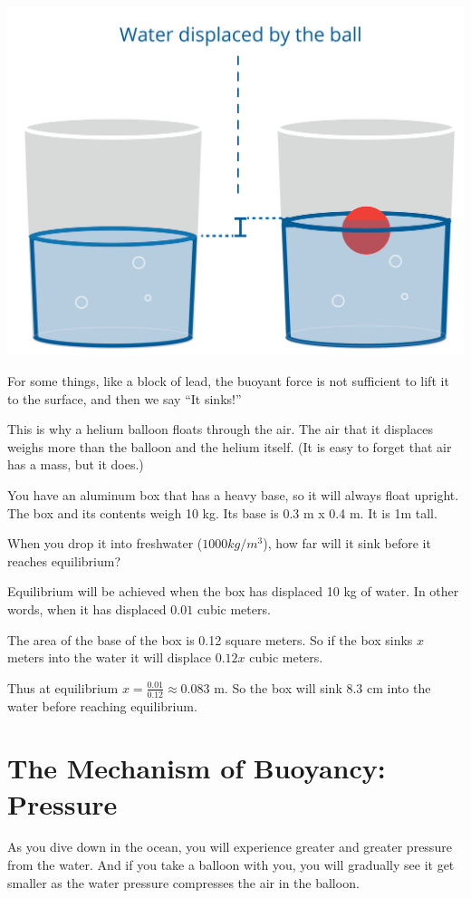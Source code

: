 \includegraphics[width=.6\textwidth]{waterDisplacement.png}

For some things, like a block of lead, the buoyant force is not
 sufficient to lift it to the surface, and then we say ``It sinks!''

This is why a helium balloon floats through the air. The air
that it displaces weighs more than the balloon and the helium itself. (It is easy to forget that air has a mass, but it does.)

\begin{Exercise}[title={Buoyancy}, label=buoyancy]
  You have an aluminum box that has a heavy base, so it will always
  float upright. The box and its contents weigh 10 kg. Its base is 0.3 m x 0.4 m. It is 1m tall.

  When you drop it into freshwater ($1000 kg/m^3$), how far will it sink
  before it reaches equilibrium?

\end{Exercise}
\begin{Answer}[ref=buoyancy]
  Equilibrium will be achieved when the box has displaced 10 kg of water. In other words, when it has displaced $0.01$ cubic meters.

  The area of the base of the box is 0.12 square meters. So if the
  box sinks $x$ meters into the water it will displace $0.12 x$ cubic
  meters.

  Thus at equilibrium $x = \frac{0.01}{0.12} \approx 0.083$ m. So
  the box will sink 8.3 cm into the water before reaching equilibrium.
\end{Answer}

\section{The Mechanism of Buoyancy: Pressure}

As you dive down in the ocean, you will experience greater and
greater pressure from the water. And if you take a balloon with you, you
will gradually see it get smaller as the water pressure compresses the
air in the balloon.

